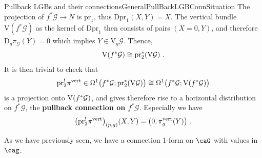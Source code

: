 \documentclass[reqno,a4paper,oneside]{amsart}
\theoremstyle{plain}
\theoremstyle{remark}
\theoremstyle{definition}
\begin{document}
\begin{remarks}{Pullback LGBs and their connections}{GeneralPullBackLGBConnSituation}
The projection of $f^*\mathcal{G} \to N$ is $\mathrm{pr}_1$, thus $\mathrm{Dpr}_1(X, Y) = X$. The vertical bundle $\mathrm{V}(f^*\mathcal{G})$ as the kernel of $\mathrm{Dpr}_1$ then consists of pairs $(X = 0, Y)$, and therefore $\mathrm{D}_g\pi_{\mathcal{G}}(Y) = 0$ which implies $Y \in \mathrm{V}_g\mathcal{G}$. Thence,
\begin{equation*}
\mathrm{V}\mleft( f^*\mathcal{G} \mright)
\cong
\mathrm{pr}_2^*\mleft( \mathrm{V}\mathcal{G} \mright)~.
\end{equation*}
It is then trivial to check that
\begin{equation*}
\mathrm{pr}_2^!\pi^{\mathrm{vert}}
\in
\Omega^1\bigl(f^*\mathcal{G}; \mathrm{pr}_2^*\mleft( \mathrm{V}\mathcal{G} \mright)\bigr)
\cong
\Omega^1\bigl(f^*\mathcal{G}; \mathrm{V}\mleft( f^*\mathcal{G} \mright)\bigr)
\end{equation*}
is a projection onto $\mathrm{V}\mleft( f^*\mathcal{G} \mright)$, and gives therefore rise to a horizontal distribution on $f^*\mathcal{G}$, the \textbf{pullback connection on $f^*\mathcal{G}$}. Especially we have
\begin{equation*}
\mleft(\mathrm{pr}_2^!\pi^{\mathrm{vert}}\mright)_{(p,g)}(X, Y)
=
\mleft( 0, \pi^{\mathrm{vert}}_g(Y) \mright)~.
\end{equation*}
\end{remarks}

As we have previously seen, we have a connection 1-form on $\caG$ with values in $\cag$.
\end{document}
